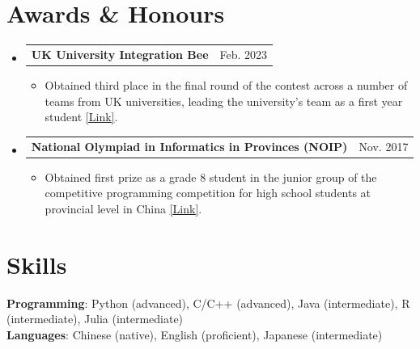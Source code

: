 \documentclass[letterpaper,11pt]{article}
\makeatletter
\newcommand{\resumeItem}[1]{
  \item\small{
    {#1 \vspace{-2pt}}
  }
}
\newcommand{\resumeSubheadingg}[4]{
  \vspace{-2pt}\item
    \begin{tabular*}{0.97\textwidth}[t]{l@{\extracolsep{\fill}}r}
      \textbf{#1} & #2 \\
    \end{tabular*}\vspace{-7pt}
}
\newcommand{\resumeSubHeadingListStart}{\begin{itemize}[leftmargin=0.15in, label={}]}
\newcommand{\resumeSubHeadingListEnd}{\end{itemize}}
\newcommand{\resumeItemListStart}{\begin{itemize}}
\newcommand{\resumeItemListEnd}{\end{itemize}\vspace{-5pt}}
\makeatother
\begin{document}
\section{Awards \& Honours}
  \resumeSubHeadingListStart
    \resumeSubheadingg
      {UK University Integration Bee}{Feb. 2023}{}{}
      \resumeItemListStart
        \resumeItem{Obtained third place in the final round of the contest across a number of teams from UK universities, leading the university's team as a first year student \href{https://integration.soc.srcf.net/pastcomp.html}{[\underline{Link}]}.}
      \resumeItemListEnd
    \resumeSubheadingg
      {National Olympiad in Informatics in Provinces (NOIP)}{Nov. 2017}{}{}
      \resumeItemListStart
        \resumeItem{Obtained first prize as a grade 8 student in the junior group of the competitive programming competition for high school students at provincial level in China \href{https://www.noi.cn/ccf/file/do?fid=njQeyabh&attach=n}{[\underline{Link}]}.}
      \resumeItemListEnd
  \resumeSubHeadingListEnd
\section{Skills}
 \begin{itemize}[leftmargin=0.15in, label={}]
    \small{\item{
     \textbf{Programming}{: Python (advanced), C/C++ (advanced), Java (intermediate), R (intermediate), Julia (intermediate)} \\
     \textbf{Languages}{: Chinese (native), English (proficient), Japanese (intermediate)}
    }}
 \end{itemize}
\end{document}
